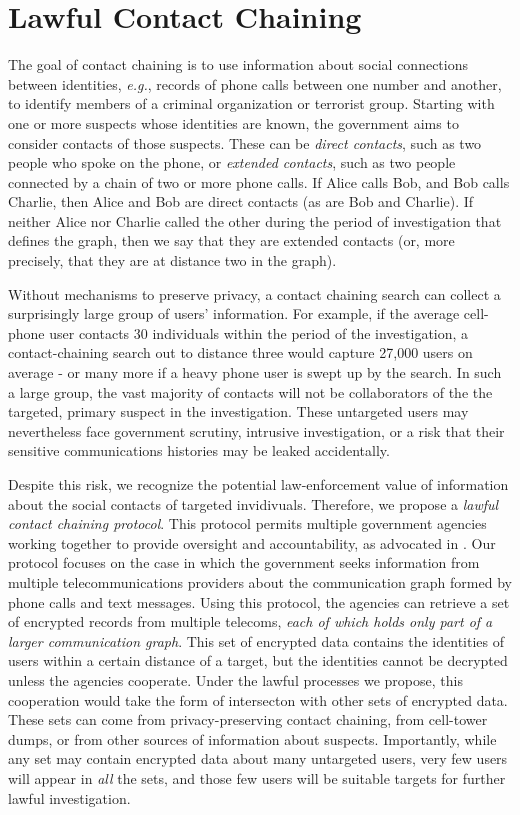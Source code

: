 \section{Lawful Contact Chaining}\label{sec-chaining}
The goal of contact chaining is to use information about social connections between identities, {\it e.g.}, records of phone calls between one number and another, to identify members of a criminal organization or terrorist group. Starting with one or more suspects whose identities are known, the government aims to consider contacts of those suspects. These can be \emph{direct contacts}, such as two people who spoke on the phone, or \emph{extended contacts}, such as two people connected by a chain of two or more phone calls. If Alice calls Bob, and Bob calls Charlie, then Alice and Bob are direct contacts (as are Bob and Charlie).  If neither Alice nor Charlie called the other during the period of investigation that defines the graph, then we say that they are extended contacts (or, more precisely, that they are at distance two in the graph). 

Without mechanisms to preserve privacy, a contact chaining search can collect a surprisingly large group of users' information. For example, if the average 
cell-phone user contacts 30 individuals within the period of the investigation,
a contact-chaining search out to distance three would capture 27,000 users on average - or many more if a heavy phone user is swept up by the search. In such a large group, the vast majority of contacts will not be collaborators of the the targeted, primary suspect in the investigation. These untargeted users may nevertheless face government scrutiny, intrusive investigation, or a risk that their sensitive communications histories may be leaked accidentally.

Despite this risk, 
we recognize the potential law-enforce\-ment value of information about the social contacts of targeted invidivuals. Therefore, we propose a \emph{lawful contact chaining protocol}. This protocol permits multiple government agencies working together to provide oversight and accountability, as advocated in \cite{sff-foci2014}. Our protocol focuses on the case in which the government seeks information from multiple telecommunications providers about the communication graph formed by phone calls and text messages. Using this protocol, the agencies can retrieve a set of encrypted records from multiple telecoms, {\it each of which holds only part of a larger communication graph}. This set of encrypted data 
contains the identities of users within a certain distance of a target, but the identities cannot be decrypted unless the agencies cooperate. Under the lawful processes we propose, this cooperation would take the form of intersecton with other sets of encrypted data. These sets can come from privacy-preserving contact chaining, from cell-tower dumps, or from other sources of information about suspects. Importantly, while any set may contain encrypted data about many untargeted users, very few users will appear in \emph{all} the sets, and those few users will be suitable targets for further lawful investigation.



